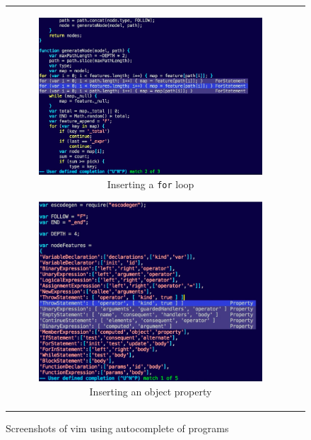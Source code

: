 \documentclass{article}
\begin{document}
\begin{figure}[ht]
	\centering
	\begin{tabular}{c c}
		\begin{subfigure}[h]{6.25cm}
			\centering
			\includegraphics[width=1.00\textwidth]{vim1}
			\caption{Inserting a {\tt for} loop} \label{fig:vim1}
		\end{subfigure}
		\begin{subfigure}[h]{6cm}
			\centering
			\includegraphics[width=1.00\textwidth]{vim2}
			\caption{Inserting an object property} \label{fig:vim2}
		\end{subfigure}
	\end{tabular}
	\caption{Screenshots of vim using autocomplete of programs}
\end{figure}
\end{document}
